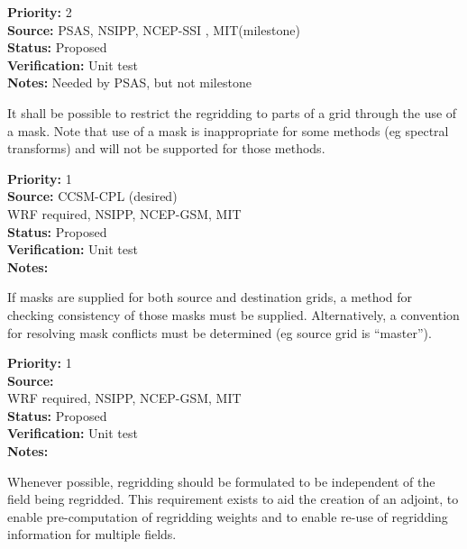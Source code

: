 \begin{reqlist}
{\bf Priority:} 2 \\
{\bf Source:} PSAS, NSIPP, NCEP-SSI , MIT(milestone)\\
{\bf Status:} Proposed \\
{\bf Verification:} Unit test \\
{\bf Notes:} Needed by PSAS, but not milestone
\end{reqlist}


It shall be possible to restrict the regridding to parts of a grid through 
the use of a mask.  Note that use of a mask is inappropriate for some methods 
(eg spectral transforms) and will not be supported for those methods.

\begin{reqlist}
{\bf Priority:} 1 \\
{\bf Source:} CCSM-CPL (desired) \\
              WRF required, NSIPP, NCEP-GSM, MIT \\
{\bf Status:} Proposed \\
{\bf Verification:} Unit test \\
{\bf Notes:} 
\end{reqlist}


If masks are supplied for both source and destination grids, a
method for checking consistency of those masks must be supplied.
Alternatively, a convention for resolving mask conflicts must
be determined (eg source grid is ``master'').

\begin{reqlist}
{\bf Priority:} 1 \\
{\bf Source:}  \\
              WRF required, NSIPP, NCEP-GSM, MIT \\
{\bf Status:} Proposed \\
{\bf Verification:} Unit test \\
{\bf Notes:} 
\end{reqlist}


Whenever possible, regridding should be formulated to be
independent of the field being regridded.  This requirement exists to
aid the creation of an adjoint, to enable pre-computation of regridding
weights and to enable re-use of regridding information for multiple
fields.

